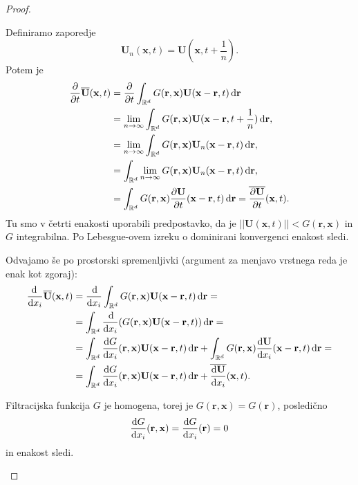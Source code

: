 \documentclass[mat2, tisk]{fmfdelo}
\newcommand{\R}{\mathbb R}
\newcommand{\bd}{\textbf}
\begin{document}
\begin{proof}
\begin{enumerate}
\begin{itemize}
    Definiramo zaporedje 
    $$
    \bd{U}_n(\bd{x}, t) = \bd{U}(\bd{x}, t + \frac{1}{n}). 
    $$
    Potem je
    \begin{align*}
    \frac{\partial}{\partial t} \overline{\bd{U}}(\bd{x}, t) &= \frac{\partial}{\partial t} \int_{\R^d} G(\bd{r}, \bd{x}) \bd{U}(\bd{x}-\bd{r}, t) \dif \bd{r} \\
    &= \lim_{n\rightarrow \infty} \int_{\R^d} G(\bd{r}, \bd{x}) \bd{U}(\bd{x}-\bd{r}, t + \frac{1}{n}) \dif \bd{r}, \\
    &= \lim_{n\rightarrow \infty} \int_{\R^d} G(\bd{r}, \bd{x}) \bd{U}_n(\bd{x} - \bd{r}, t) \dif \bd{r}, \\
    &= \int_{\R^d}\lim_{n\rightarrow \infty} G(\bd{r}, \bd{x}) \bd{U}_n(\bd{x} - \bd{r}, t) \dif \bd{r}, \\
    &= \int_{\R^d} G(\bd{r}, \bd{x}) \frac{\partial \bd{U}}{\partial t}(\bd{x}-\bd{r}, t) \dif \bd{r} = \overline{\frac{\partial \bd{U}}{\partial t}}(\bd{x}, t).
    \end{align*}
    Tu smo v četrti enakosti uporabili predpostavko, da je $||\bd{U}(\bd{x}, t)|| < G(\bd{r}, \bd{x})$ in $G$ integrabilna. Po Lebesgue-ovem izreku o dominirani konvergenci enakost sledi.
  \end{itemize}
  Odvajamo še po prostorski spremenljivki (argument za menjavo vrstnega reda je enak kot zgoraj):
  \begin{align*}
  \frac{\!\!\dif}{\dif x_i} \overline{\bd{U}}(\bd{x}, t) &= \frac{\dif}{\dif x_i} \int_{\R^d} G(\bd{r}, \bd{x}) \bd{U}(\bd{x}-\bd{r}, t) \dif \bd{r} = \\
  &=  \int_{\R^d} \frac{\dif}{\dif x_i} (G(\bd{r}, \bd{x}) \bd{U}(\bd{x}-\bd{r}, t)) \dif \bd{r} = \\
  &=  \int_{\R^d} \frac{\dif G}{\dif x_i}(\bd{r}, \bd{x})  \bd{U}(\bd{x}-\bd{r}, t) \dif \bd{r} + \int_{\R^d} G(\bd{r}, \bd{x})  \frac{\dif \bd{U}}{\dif x_i}(\bd{x}-\bd{r}, t) \dif \bd{r} = \\
  &= \int_{\R^d} \frac{\dif G}{\dif x_i}(\bd{r}, \bd{x})  \bd{U}(\bd{x}-\bd{r}, t) \dif \bd{r} + \overline{\frac{\dif \bd{U}}{\dif x_i}}(\bd{x}, t).
  \end{align*}

Filtracijska funkcija $G$ je homogena, torej je $G(\bd{r}, \bd{x}) = G(\bd{r})$, posledično 
$$\frac{\dif G}{\dif x_i}(\bd{r}, \bd{x}) = \frac{\dif G}{\dif x_i}(\bd{r}) = 0$$
in enakost sledi.
\end{enumerate}
\end{proof}
\end{document}
